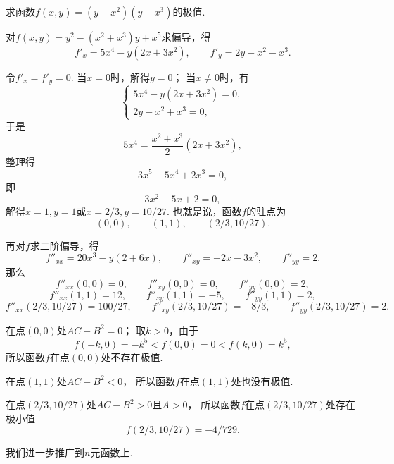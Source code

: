 \begin{example}
求函数\(f(x,y) = (y-x^2)(y-x^3)\)的极值.
\begin{solution}
对\(f(x,y) = y^2 - (x^2+x^3) y + x^5\)求偏导，得\[
	f'_x = 5x^4 - y(2x+3x^2),
	\qquad
	f'_y = 2y - x^2 - x^3.
\]

令\(f'_x = f'_y = 0\).
当\(x=0\)时，解得\(y = 0\)；
当\(x\neq0\)时，有\[
	\begin{cases}
		5x^4-y(2x+3x^2) = 0, \\
		2y-x^2+x^3 = 0,
	\end{cases}
\]
于是\[
	5x^4 = \frac{x^2+x^3}{2}(2x+3x^2),
\]
整理得\[
	3x^5-5x^4+2x^3=0,
\]
即\[
	3x^2-5x+2=0,
\]
解得\(x=1,y=1\)或\(x=2/3,y=10/27\).
也就是说，函数\(f\)的驻点为\[
	(0,0), \qquad
	(1,1), \qquad
	(2/3,10/27).
\]

再对\(f\)求二阶偏导，得\[
	f''_{xx} = 20x^3 - y(2+6x),
	\qquad
	f''_{xy} = -2x-3x^2,
	\qquad
	f''_{yy} = 2.
\]
那么
\[
	f''_{xx}(0,0) = 0,
	\qquad
	f''_{xy}(0,0) = 0,
	\qquad
	f''_{yy}(0,0) = 2,
\]\[
	f''_{xx}(1,1) = 12,
	\qquad
	f''_{xy}(1,1) = -5,
	\qquad
	f''_{yy}(1,1) = 2,
\]\[
	f''_{xx}(2/3,10/27) = 100/27,
	\qquad
	f''_{xy}(2/3,10/27) = -8/3,
	\qquad
	f''_{yy}(2/3,10/27) = 2.
\]

在点\((0,0)\)处\(AC-B^2 = 0\)；
取\(k>0\)，由于\[
f(-k,0) = -k^5 < f(0,0) = 0 < f(k,0) = k^5,
\]所以函数\(f\)在点\((0,0)\)处不存在极值.

在点\((1,1)\)处\(AC-B^2 < 0\)，
所以函数\(f\)在点\((1,1)\)处也没有极值.

在点\((2/3,10/27)\)处\(AC-B^2 > 0\)且\(A>0\)，
所以函数\(f\)在点\((2/3,10/27)\)处存在极小值\[
	f(2/3,10/27) = -4/729.
\]
\end{solution}
\end{example}

我们进一步推广到\(n\)元函数上.
\begingroup
\def\x{\vb{X}}
\def\X#1{\x_{#1}}
\def\z{\vb{0}}

